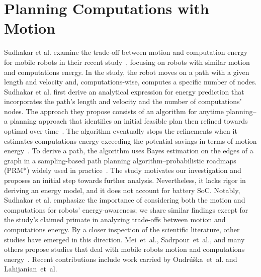 

\section{Planning Computations with Motion}
\label{sec:soa-comp-motion-pl}

Sudhakar et al. examine the trade-off between motion and computation energy for mobile robots in their recent study~\citep{sudhakar2020balancing}, focusing on robots with similar motion and computations energy. In the study, the robot moves on a path with a given length and velocity and, computations-wise, computes a specific number of nodes. Sudhakar et al. first derive an analytical expression for energy prediction that incorporates the path's length and velocity and the number of computations' nodes. The approach they propose consists of an algorithm for anytime planning--a planning approach that identifies an initial feasible plan then refined towards optimal over time~\citep{karaman2011anytime}. The algorithm eventually stops the refinements when it estimates computations energy exceeding the potential savings in terms of motion energy~\citep{sudhakar2020balancing}. To derive a path, the algorithm uses Bayes estimation on the edges of a graph in a sampling-based path planning algorithm--probabilistic roadmaps (PRM*) widely used in practice~\citep{lavalle2006planning,karaman2011sampling}. The study motivates our investigation and proposes an initial step towards further analysis. Nevertheless, it lacks rigor in deriving an energy model, and it does not account for battery SoC. Notably, Sudhakar et al. emphasize the importance of considering both the motion and computations for robots' energy-awareness; we share similar findings except for the study's claimed primate in analyzing trade-offs between motion and computations energy. By a closer inspection of the scientific literature, other studies have emerged in this direction. Mei~et~al., Sadrpour~et~al., and many others propose studies that deal with mobile robots motion and computations energy~\citep{mei2005case,mei2006deployment,brateman2006energy,zhang2007low,sadrpour2013experimental,sadrpour2013mission}. Recent contributions include work carried by Ondr\'{u}\v{s}ka~et~al. and Lahijanian~et~al.~\citep{ondruska2015scheduled,lahijanian2018resource}

